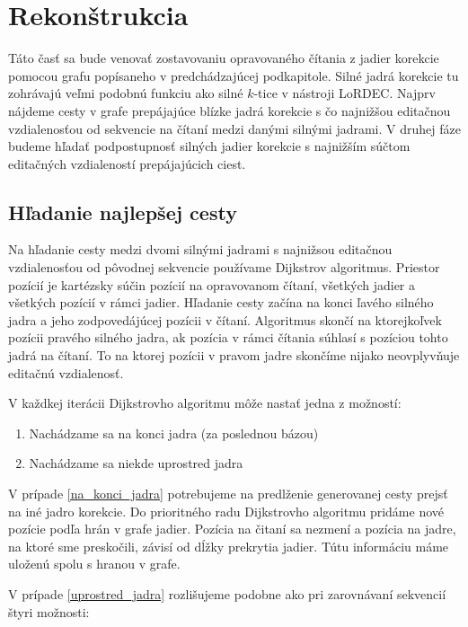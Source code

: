 \section{Rekonštrukcia}

Táto časť sa bude venovať zostavovaniu opravovaného čítania z jadier korekcie pomocou grafu popísaneho v predchádzajúcej podkapitole. Silné jadrá korekcie tu zohrávajú veľmi podobnú funkciu ako silné $k$-tice v nástroji LoRDEC. Najprv nájdeme cesty v grafe prepájajúce blízke jadrá korekcie s čo najnižšou editačnou vzdialenosťou od sekvencie na čítaní medzi danými silnými jadrami. V druhej fáze budeme hľadať podpostupnosť silných jadier korekcie s najnižším súčtom editačných vzdialeností prepájajúcich ciest.

\subsection{Hľadanie najlepšej cesty}

Na hľadanie cesty medzi dvomi silnými jadrami s najnižsou editačnou vzdialenosťou od pôvodnej sekvencie používame Dijkstrov algoritmus. Priestor pozícií je kartézsky súčin pozícií na opravovanom čítaní, všetkých jadier a všetkých pozícií v rámci jadier. Hľadanie cesty začína na konci ľavého silného jadra a jeho zodpovedájúcej pozícii v čítaní. Algoritmus skončí na ktorejkoľvek pozícii pravého silného jadra, ak pozícia v rámci čítania súhlasí s pozíciou tohto jadrá na čítaní. To na ktorej pozícii v pravom jadre skončíme nijako neovplyvňuje editačnú vzdialenosť.

V každkej iterácii Dijkstrovho algoritmu môže nastať jedna z možností:
\begin{enumerate}[label={S.\arabic*}]
\item \label{na_konci_jadra} Nachádzame sa na konci jadra (za poslednou bázou)
\item \label{uprostred_jadra} Nachádzame sa niekde uprostred jadra
\end{enumerate}

V prípade \ref{na_konci_jadra} potrebujeme na predlženie generovanej cesty prejsť na iné jadro korekcie. Do prioritného radu Dijkstrovho algoritmu pridáme nové pozície podľa hrán v grafe jadier. Pozícia na čitaní sa nezmení a pozícia na jadre, na ktoré sme preskočili, závisí od dĺžky prekrytia jadier. Tútu informáciu máme uloženú spolu s hranou v grafe.

V prípade \ref{uprostred_jadra} rozlišujeme podobne ako pri zarovnávaní sekvencií štyri možnosti:

